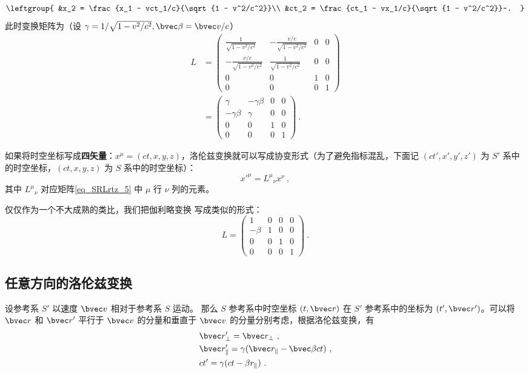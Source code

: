 \begin{equation}
\leftgroup{
&x_2 = \frac{x_1 - vct_1/c}{\sqrt{1 - v^2/c^2}}\\
&ct_2 = \frac{ct_1 - vx_1/c}{\sqrt{1 - v^2/c^2}}~.
}
\end{equation}
此时变换矩阵为（设 $\gamma=1/\sqrt{1-v^2/c^2},\bvec \beta=\bvec v/c$）
\begin{equation}\label{eq_SRLrtz_5}
\begin{aligned}
L&=
\left(\begin{matrix}
\frac{1}{\sqrt{1-v^2/c^2}}& -\frac{v/c}{\sqrt{1-v^2/c^2}}& 0& 0\\
-\frac{v/c}{\sqrt{1-v^2/c^2}}& \frac{1}{\sqrt{1-v^2/c^2}}& 0& 0\\
0&0&1&0\\
0&0&0&1
\end{matrix}\right)\\
&=
\left(\begin{matrix}
\gamma& -\gamma\beta& 0& 0\\
-\gamma\beta& \gamma& 0& 0\\
0&0&1&0\\
0&0&0&1
\end{matrix}\right)~.
\end{aligned}
\end{equation}

如果将时空坐标写成\textbf{四矢量}：$x^{\mu}=(ct,x,y,z)$，洛伦兹变换就可以写成协变形式（为了避免指标混乱，下面记 $(ct',x',y',z')$ 为 $S'$ 系中的时空坐标，$(ct,x,y,z)$ 为 $S$ 系中的时空坐标）：
\begin{equation}
x'^{\mu}={L^\mu}_\nu x^\nu~,
\end{equation}
其中 ${L^\mu}_\nu$ 对应矩阵\autoref{eq_SRLrtz_5} 中 $\mu$ 行 $\nu$ 列的元素。

仅仅作为一个不大成熟的类比，我们把伽利略变换 写成类似的形式：
$$
L=\left(\begin{matrix}
1& 0& 0& 0\\
-\beta& 1& 0& 0\\
0&0&1&0\\
0&0&0&1
\end{matrix}\right)~.
$$

\subsection{任意方向的洛伦兹变换}
设参考系 $S'$ 以速度 $\bvec v$ 相对于参考系 $S$ 运动。
那么 $S$ 参考系中时空坐标 $(t,\bvec r)$ 在 $S'$ 参考系中的坐标为 $(t',\bvec r')$。可以将 $\bvec r$ 和 $\bvec r'$ 平行于 $\bvec v$ 的分量和垂直于 $\bvec v$ 的分量分别考虑，根据洛伦兹变换，有
\begin{equation}
\begin{aligned}
&\bvec r'_{\perp}=\bvec r_{\perp}~,\\
&\bvec r'_{\parallel}=\gamma(\bvec r_{\parallel}-\bvec \beta ct)~,\\
&ct'=\gamma(ct-\beta r_{\parallel})~.
\end{aligned}
\end{equation}

